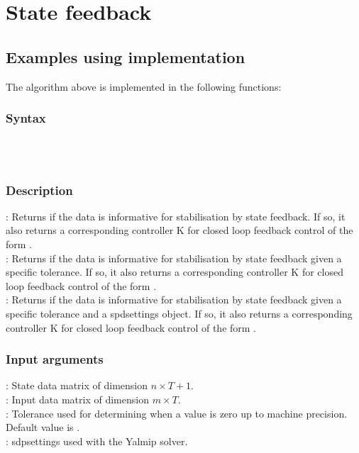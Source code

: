 \section{State feedback}










\subsection{Examples using implementation}
The algorithm above is implemented in the following functions:
\subsubsection*{Syntax}
 \\
 \\

\subsubsection*{Description}
: Returns if the data is informative for stabilisation by state feedback. If so, it also returns a corresponding controller K for closed loop feedback control of the form .\\
: Returns if the data is informative for stabilisation by state feedback given a specific tolerance. If so, it also returns a corresponding controller K for closed loop feedback control of the form .\\
: Returns if the data is informative for stabilisation by state feedback given a specific tolerance and a spdsettings object. If so, it also returns a corresponding controller K for closed loop feedback control of the form .

\subsubsection*{Input arguments}
\textbf{}: State data matrix of dimension $n \times T+1$.\\
\textbf{}: Input data matrix of dimension $m \times T$.\\
\textbf{}: Tolerance used for determining when a value is zero up to machine precision. Default value is .\\
\textbf{}: sdpsettings used with the Yalmip solver.

